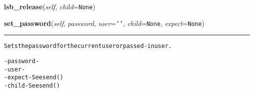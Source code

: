     \label{shutit_global:ShutIt:lsb_release}

    \vspace{0.5ex}

\hspace{.8\funcindent}\begin{boxedminipage}{\funcwidth}

    \raggedright \textbf{lsb\_release}(\textit{self}, \textit{child}={\tt None})

\setlength{\parskip}{2ex}
\setlength{\parskip}{1ex}
    \end{boxedminipage}

    \label{shutit_global:ShutIt:set_password}

    \vspace{0.5ex}

\hspace{.8\funcindent}\begin{boxedminipage}{\funcwidth}

    \raggedright \textbf{set\_password}(\textit{self}, \textit{password}, \textit{user}={\tt \texttt{'}\texttt{}\texttt{'}}, \textit{child}={\tt None}, \textit{expect}={\tt None})

    \vspace{-1.5ex}

    \rule{\textwidth}{0.5\fboxrule}
\setlength{\parskip}{2ex}
\begin{alltt}
Sets the password for the current user or passed-in user.

- password - 
- user     - 
- expect   - See send()
- child    - See send()
\end{alltt}

\setlength{\parskip}{1ex}
    \end{boxedminipage}

    \label{shutit_global:ShutIt:is_user_id_available}

    \vspace{0.5ex}

